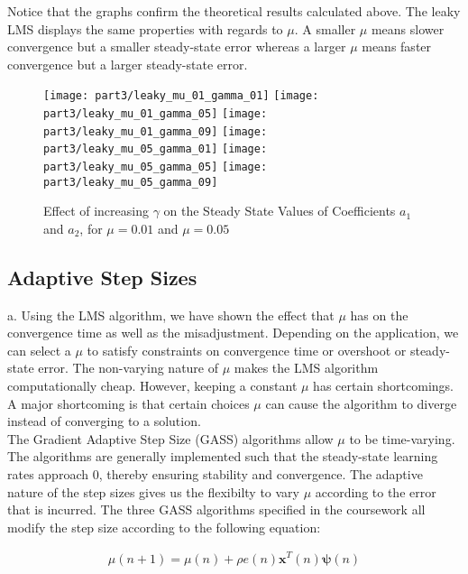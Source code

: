 \noindent{}Notice that the graphs confirm the theoretical results calculated above. The leaky LMS displays the same properties with regards to $\mu$. A smaller $\mu$ means slower convergence but a smaller steady-state error whereas a larger $\mu$ means faster convergence but a larger steady-state error. 

\begin{figure}[H]
\centering{}
\texttt{[image: part3/leaky\_mu\_01\_gamma\_01]}
\texttt{[image: part3/leaky\_mu\_01\_gamma\_05]}
\texttt{[image: part3/leaky\_mu\_01\_gamma\_09]}
\texttt{[image: part3/leaky\_mu\_05\_gamma\_01]}
\texttt{[image: part3/leaky\_mu\_05\_gamma\_05]}
\texttt{[image: part3/leaky\_mu\_05\_gamma\_09]}
\caption{Effect of increasing $\gamma$ on the Steady State Values of Coefficients $a_1$ and $a_2$, for $\mu=0.01$ and $\mu=0.05$}
\label{fig:leaky_lms}
\end{figure}

\subsection{Adaptive Step Sizes}

\noindent{}a. Using the LMS algorithm, we have shown the effect that $\mu$ has on the convergence time as well as the misadjustment. Depending on the application, we can select a $\mu$ to satisfy constraints on convergence time or overshoot or steady-state error. The non-varying nature of $\mu$ makes the LMS algorithm computationally cheap. However, keeping a constant $\mu$ has certain shortcomings. A major shortcoming is that certain choices $\mu$ can cause the algorithm to diverge instead of converging to a solution. \\

\noindent{}The Gradient Adaptive Step Size (GASS) algorithms allow $\mu$ to be time-varying. The algorithms are generally implemented such that the steady-state learning rates approach 0, thereby ensuring stability and convergence. The adaptive nature of the step sizes gives us the flexibilty to vary $\mu$ according to the error that is incurred. The three GASS algorithms specified in the coursework all modify the step size according to the following equation:

\begin{align*}
\mu(n+1)=\mu(n) + \rho e(n) \textbf{x}^T(n)\bm{\psi}(n)
\end{align*}

